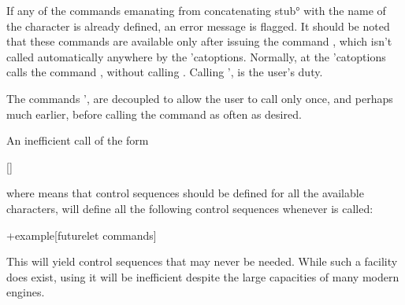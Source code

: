 \documentclass[
  use-a4-paper,
  use-10pt-font,
  final-version,
  use-UK-English,
  fancy-section-headings,
  frame-section-numbers,
  para-abstract-style,
  input-config-file,
  no-hyperref-messages
]{amltxdoc}
\begin{document}
If any of the commands emanating from concatenating \ang{stub} with the name of the character is already defined, an error message is flagged. It should be noted that these commands are available only after issuing the command \fx{\cptfutureletsetup}, which isn't called automatically anywhere by the \pkg'{catoptions}. Normally, at \hx{\AtBeginDocument} the \pkg'{catoptions} calls the command \fx{\cptrestorecatcodes}, without calling \fx{\cptfutureletsetup}. Calling \ffx'{\declarefutureletset, \cptfutureletsetup} is the user's duty.

The commands \ffx'{\declarefutureletset, \cptfutureletsetup} are decoupled to allow the user to call \fx{\declarefutureletset} only once, and perhaps much earlier, before calling the command \fx{\cptfutureletsetup} as often as desired.

An inefficient call of the form

[\declarefutureletset]

where  means that control sequences should be defined for all the available  characters, will define all the following control sequences whenever \fx{\cptfutureletsetup} is called:

\start+{example}[futurelet commands]
\fl@space         \fl@exclam        \fl@dblquote      \fl@hash
\fl@dollar        \fl@ampersand     \fl@lrquote       \fl@lparen
\fl@rparen        \fl@star          \fl@plus          \fl@comma
\fl@hyphen        \fl@period        \fl@slash         \fl@colon
\fl@semicolon     \fl@less          \fl@equal         \fl@greater
\fl@question      \fl@lbracket      \fl@rbracket      \fl@hat
\fl@underscore    \fl@lquote        \fl@lbrace        \fl@vert
\fl@rbrace        \fl@tilde         \fl@bslash

\iffl@space       \iffl@exclam      \iffl@dblquote    \iffl@hash
\iffl@dollar      \iffl@ampersand   \iffl@lrquote     \iffl@lparen
\iffl@rparen      \iffl@star        \iffl@plus        \iffl@comma
\iffl@hyphen      \iffl@period      \iffl@slash       \iffl@colon
\iffl@semicolon   \iffl@less        \iffl@equal       \iffl@greater
\iffl@question    \iffl@lbracket    \iffl@rbracket    \iffl@hat
\iffl@underscore  \iffl@lquote      \iffl@lbrace      \iffl@vert
\iffl@rbrace      \iffl@tilde       \iffl@bslash
{}

This will yield control sequences that may never be needed. While such a facility does exist, using it will be inefficient despite the large capacities of many modern \tex engines.
\end{document}
